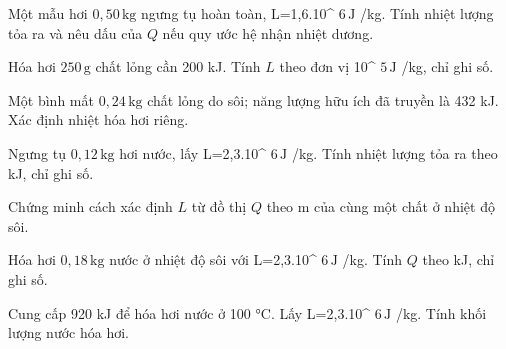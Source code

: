 \begin{bt}
Một mẫu hơi $0,50\,\text{kg}$ ngưng tụ hoàn toàn, L=1,6.10^ $6\,\text{J}$ /kg. Tính nhiệt lượng tỏa ra và nêu dấu của $Q$ nếu quy ước hệ nhận nhiệt dương.
\end{bt}

\begin{ex}
Hóa hơi $250\,\text{g}$ chất lỏng cần 200 kJ. Tính $L$ theo đơn vị 10^ $5\,\text{J}$ /kg, chỉ ghi số.
\end{ex}

\begin{bt}
Một bình mất $0,24\,\text{kg}$ chất lỏng do sôi; năng lượng hữu ích đã truyền là 432 kJ. Xác định nhiệt hóa hơi riêng.
\end{bt}

\begin{ex}
Ngưng tụ $0,12\,\text{kg}$ hơi nước, lấy L=2,3.10^ $6\,\text{J}$ /kg. Tính nhiệt lượng tỏa ra theo kJ, chỉ ghi số.
\end{ex}

\begin{bt}
Chứng minh cách xác định $L$ từ đồ thị $Q$ theo m của cùng một chất ở nhiệt độ sôi.
\end{bt}

\begin{ex}
Hóa hơi $0,18\,\text{kg}$ nước ở nhiệt độ sôi với L=2,3.10^ $6\,\text{J}$ /kg. Tính $Q$ theo kJ, chỉ ghi số.
\end{ex}

\begin{bt}
Cung cấp 920 kJ để hóa hơi nước ở 100 °C. Lấy L=2,3.10^ $6\,\text{J}$ /kg. Tính khối lượng nước hóa hơi.
\end{bt}

